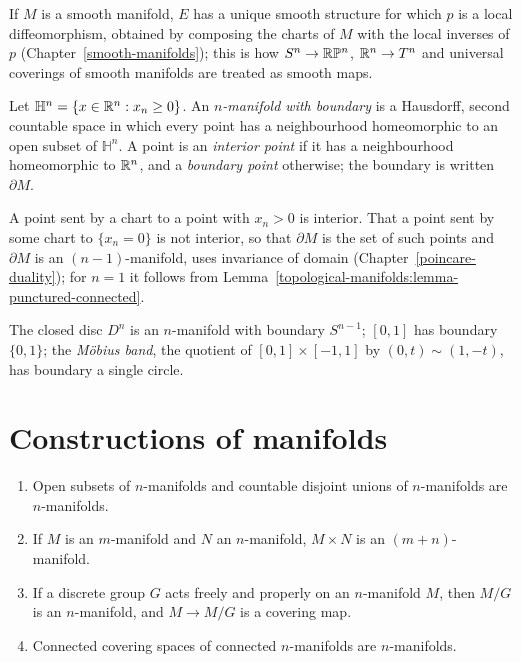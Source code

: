 If $M$ is a smooth manifold, $E$ has a unique smooth structure for which $p$ is a local diffeomorphism, obtained by composing the charts of $M$ with the local inverses of $p$
(Chapter~\ref{smooth-manifolds}); this is how $S^n \to \mathbb{R}\mathbb{P}^n$, $\mathbb{R}^n \to T^n$ and universal coverings of smooth manifolds are treated as smooth maps.

\begin{definition}\label{topological-manifolds:definition-boundary}
Let $\mathbb{H}^n = \{x \in \mathbb{R}^n : x_n \geq 0\}$. An \emph{$n$-manifold with boundary} is a Hausdorff, second countable space in which every point has a neighbourhood homeomorphic to an open subset of $\mathbb{H}^n$. A point is an
\emph{interior point} if it has a neighbourhood homeomorphic to $\mathbb{R}^n$, and a \emph{boundary point} otherwise; the boundary is written $\partial M$.
\end{definition}

A point sent by a chart to a point with $x_n > 0$ is interior. That a point sent by some chart to $\{x_n = 0\}$ is not interior, so that $\partial M$ is the set of such points and $\partial M$ is an $(n-1)$-manifold, uses invariance
of domain (Chapter~\ref{poincare-duality}); for $n = 1$ it follows from Lemma~\ref{topological-manifolds:lemma-punctured-connected}.

\begin{example}\label{topological-manifolds:example-boundary}
The closed disc $D^n$ is an $n$-manifold with boundary $S^{n-1}$; $[0, 1]$ has boundary $\{0, 1\}$; the \emph{M\"obius band}, the quotient of $[0, 1] \times [-1, 1]$ by $(0, t) \sim (1, -t)$, has boundary a single circle.
\end{example}

\section{Constructions of manifolds}\label{topological-manifolds:section-constructions}

\begin{proposition}\label{topological-manifolds:proposition-constructions}
\begin{enumerate}
\item Open subsets of $n$-manifolds and countable disjoint unions of $n$-manifolds are $n$-manifolds.
\item If $M$ is an $m$-manifold and $N$ an $n$-manifold, $M \times N$ is an $(m + n)$-manifold.
\item If a discrete group $G$ acts freely and properly on an $n$-manifold $M$, then $M/G$ is an $n$-manifold, and $M \to M/G$ is a covering map.
\item Connected covering spaces of connected $n$-manifolds are $n$-manifolds.
\end{enumerate}
\end{proposition}


